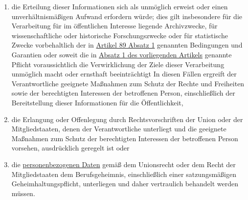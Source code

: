 \begin{enumerate}
\begin{enumerate}
    \item die Erteilung dieser Informationen sich als unmöglich erweist oder einen unverhältnismäßigen Aufwand erfordern
     würde; dies gilt insbesondere für die Verarbeitung für im öffentlichen Interesse liegende Archivzwecke, für
     wissenschaftliche oder historische Forschungszwecke oder für statistische Zwecke vorbehaltlich der in
     \hyperref[itm:89-1]{Artikel 89 Absatz 1} genannten Bedingungen und Garantien oder soweit die in \hyperref[itm:14-1]
      {Absatz 1 des vorliegenden Artikels} genannte Pflicht voraussichtlich die Verwirklichung der Ziele dieser
      Verarbeitung unmöglich macht oder ernsthaft beeinträchtigt In diesen Fällen ergreift der Verantwortliche
      geeignete Maßnahmen zum Schutz der Rechte und Freiheiten sowie der berechtigten Interessen der betroffenen
      Person, einschließlich der Bereitstellung dieser Informationen für die Öffentlichkeit,
    \label{itm:14-5b}

    \item die Erlangung oder Offenlegung durch Rechtsvorschriften der Union oder der Mitgliedstaaten, denen der
     Verantwortliche unterliegt und die geeignete Maßnahmen zum Schutz der berechtigten Interessen der betroffenen
     Person vorsehen, ausdrücklich geregelt ist oder
    \label{itm:14-5c}

    \item die \hyperref[itm:04-1]{personenbezogenen Daten} gemäß dem Unionsrecht oder dem Recht der Mitgliedstaaten dem Berufsgeheimnis,
     einschließlich einer satzungsmäßigen Geheimhaltungspflicht, unterliegen und daher vertraulich behandelt werden
     müssen.
    \label{itm:14-5d}

  \end{enumerate}

\end{enumerate}


